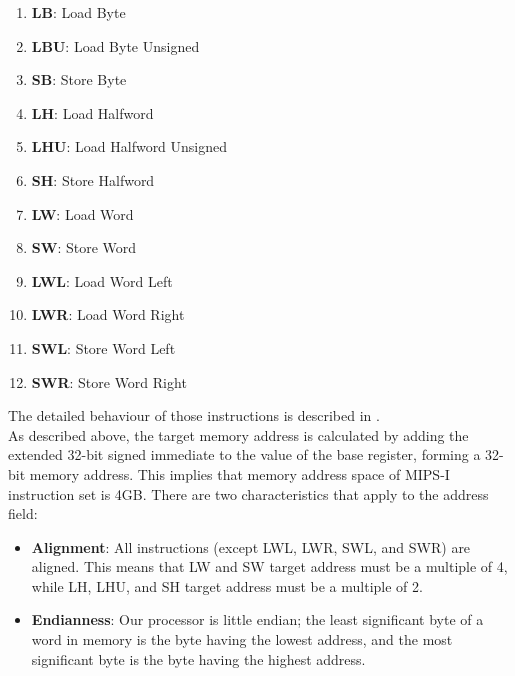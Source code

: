 \documentclass[oneside]{book}
\begin{document}
\begin{enumerate}

\item \textbf{LB}:  Load Byte
\item \textbf{LBU}: Load Byte Unsigned
\item \textbf{SB}:  Store Byte
\item \textbf{LH}:  Load Halfword
\item \textbf{LHU}: Load Halfword Unsigned
\item \textbf{SH}:  Store Halfword
\item \textbf{LW}:  Load Word
\item \textbf{SW}:  Store Word
\item \textbf{LWL}: Load Word Left
\item \textbf{LWR}: Load Word Right
\item \textbf{SWL}: Store Word Left
\item \textbf{SWR}: Store Word Right

\end{enumerate}

The detailed behaviour of those instructions is described
in \cite{mips_isa}.\\

As described above, the target memory address is calculated by
adding the extended 32-bit signed immediate to the value of
the base register, forming a 32-bit memory address. This implies
that memory address space of MIPS-I instruction set is 4GB. There
are two characteristics that apply to the address field:

\begin{itemize}

\item \textbf{Alignment}: All instructions (except LWL, LWR, SWL,
                          and SWR) are aligned. This means that
                          LW and SW target address must be
                          a multiple of 4, while LH, LHU, and
                          SH target address must be a multiple of 2.

\item \textbf{Endianness}: Our processor is little endian; the least
                           significant byte of a word in memory is the
                           byte having the lowest address, and the
                           most significant byte is the byte having
                           the highest address.

\end{itemize}
\end{document}
